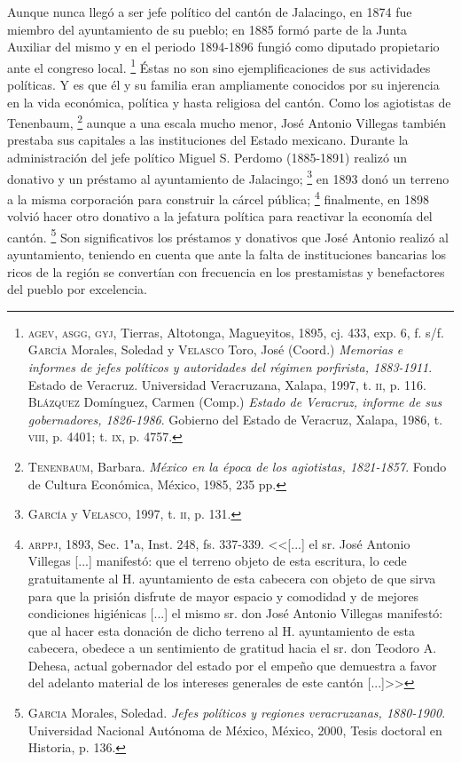 \documentclass[14pt,twoside,final]{extbook} %
\let\oldfootnote\footnote
\renewcommand\footnote[1]{%
\oldfootnote{\hspace{1mm}#1}}
\begin{document}
Aunque nunca llegó a ser jefe político del cantón de Jalacingo, en 1874 fue miembro del ayuntamiento de su pueblo; en 1885 formó parte de la Junta Auxiliar del mismo y en el periodo 1894-1896 fungió como diputado propietario ante el congreso local.\footnote{\textsc{agev, asgg, gyj}, Tierras, Altotonga, Magueyitos, 1895, cj. 433, exp. 6, f. s/f. \textsc{García} Morales, Soledad y \textsc{Velasco} Toro, José (Coord.) \emph{Memorias e informes de jefes políticos y autoridades del régimen porfirista, 1883-1911}. Estado de Veracruz. Universidad Veracruzana, Xalapa, 1997, t. \textsc{ii}, p. 116. \textsc{Blázquez} Domínguez, Carmen (Comp.) \emph{Estado de Veracruz, informe de sus gobernadores, 1826-1986}. Gobierno del Estado de Veracruz, Xalapa, 1986, t. \textsc{viii}, p. 4401; t. \textsc{ix}, p. 4757.} Éstas no son sino ejemplificaciones de sus actividades políticas. Y es que él y su familia eran ampliamente conocidos por su injerencia en la vida económica, política y hasta religiosa del cantón. Como los agiotistas de Tenenbaum,\footnote{\textsc{Tenenbaum}, Barbara. \emph{México en la época de los agiotistas, 1821-1857}. Fondo de Cultura Económica, México, 1985, 235 pp.} aunque a una escala mucho menor, José Antonio Villegas también prestaba sus capitales a las instituciones del Estado mexicano. Durante la administración del jefe político Miguel S. Perdomo (1885-1891) realizó un donativo y un préstamo al ayuntamiento de Jalacingo;\footnote{\textsc{García} y \textsc{Velasco}, 1997, t. \textsc{ii}, p. 131.} en 1893 donó un terreno a la misma corporación para construir la cárcel pública;\footnote{\textsc{arppj}, 1893, Sec. 1"a, Inst. 248, fs. 337-339. <<[...] el sr. José Antonio Villegas [...] manifestó: que el terreno objeto de esta escritura, lo cede gratuitamente al H. ayuntamiento de esta cabecera con objeto de que sirva para que la prisión disfrute de mayor espacio y comodidad y de mejores condiciones higiénicas [...] el mismo sr. don José Antonio Villegas manifestó: que al hacer esta donación de dicho terreno al H. ayuntamiento de esta cabecera, obedece a un sentimiento de gratitud hacia el sr. don Teodoro A. Dehesa, actual gobernador del estado por el empeño que demuestra a favor del adelanto material de los intereses generales de este cantón [...]>>} finalmente, en 1898 volvió hacer otro donativo a la jefatura política para reactivar la economía del cantón.\footnote{\textsc{Garcia} Morales, Soledad. \emph{Jefes políticos y regiones veracruzanas, 1880-1900}. Universidad Nacional Autónoma de México, México, 2000, Tesis doctoral en Historia, p. 136.} Son significativos los préstamos y donativos que José Antonio realizó al ayuntamiento, teniendo en cuenta que ante la falta de instituciones bancarias los ricos de la región se convertían con frecuencia en los prestamistas y benefactores del pueblo por excelencia.
\end{document}
